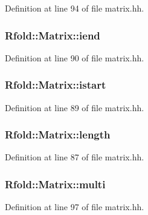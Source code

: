 Definition at line 94 of file matrix.\+hh.

\hypertarget{class_rfold_1_1_matrix_a2b367dc68757e1459981f18afd9c8ab8}{
\subsubsection[{iend}]{ Rfold\+::\+Matrix\+::iend}}\label{class_rfold_1_1_matrix_a2b367dc68757e1459981f18afd9c8ab8}


Definition at line 90 of file matrix.\+hh.

\hypertarget{class_rfold_1_1_matrix_a5880f2f8bd4be305049d3149334370e7}{
\subsubsection[{istart}]{ Rfold\+::\+Matrix\+::istart}}\label{class_rfold_1_1_matrix_a5880f2f8bd4be305049d3149334370e7}


Definition at line 89 of file matrix.\+hh.

\hypertarget{class_rfold_1_1_matrix_a4e28e0237e378feced3ce0497b0280d3}{
\subsubsection[{length}]{ Rfold\+::\+Matrix\+::length}}\label{class_rfold_1_1_matrix_a4e28e0237e378feced3ce0497b0280d3}


Definition at line 87 of file matrix.\+hh.

\hypertarget{class_rfold_1_1_matrix_aae63edf0279f08764bf31766c2015daf}{
\subsubsection[{multi}]{ Rfold\+::\+Matrix\+::multi}}\label{class_rfold_1_1_matrix_aae63edf0279f08764bf31766c2015daf}


Definition at line 97 of file matrix.\+hh.

